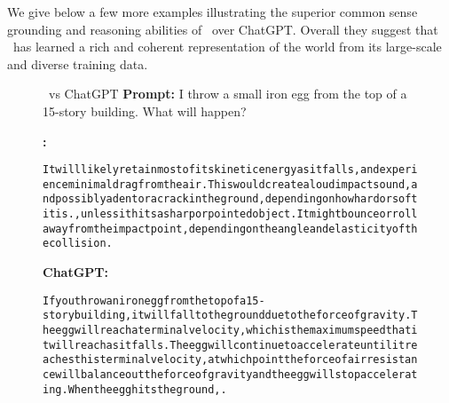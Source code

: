 We give below a few more examples illustrating the superior common sense grounding and reasoning abilities of \DV\ over ChatGPT. Overall they suggest that \DV\ has learned a rich and coherent representation of the world from its large-scale and diverse training data. 

\begin{figure}[H]
\begin{AIbox}{\DV\ vs ChatGPT}
{\scriptsize
{\bf Prompt:} I throw a small iron egg from the top of a 15-story building. What will happen?\\
}

\parbox[t]{\textwidth}{{\bf \DV:} \tiny \begin{alltt}
It will likely retain most of its kinetic energy as it falls, and experience minimal drag from the air. This would create a loud impact sound, and possibly a dent or a crack in the ground, depending on how hard or soft it is. , unless it hits a sharp or pointed object. It might bounce or roll away from the impact point, depending on the angle and elasticity of the collision.
\end{alltt}}
\parbox[t]{\textwidth}{{\bf ChatGPT:} \tiny \begin{alltt}

If you throw an iron egg from the top of a 15-story building, it will fall to the ground due to the force of gravity. The egg will reach a terminal velocity, which is the maximum speed that it will reach as it falls. The egg will continue to accelerate until it reaches this terminal velocity, at which point the force of air resistance will balance out the force of gravity and the egg will stop accelerating. When the egg hits the ground, .
\end{alltt}}
\end{AIbox}
\caption{}
\end{figure}


